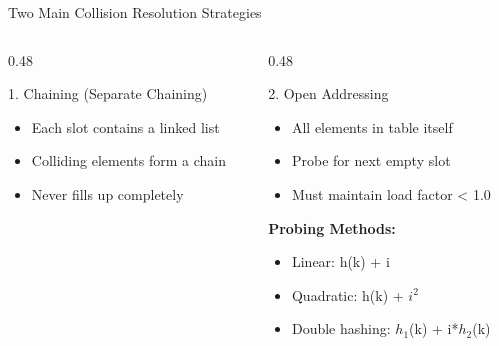 \documentclass[aspectratio=169,xcolor=dvipsnames]{beamer}
\begin{document}
\begin{frame}{Two Main Collision Resolution Strategies}
  \begin{columns}
    \begin{column}{0.48\textwidth}
      \begin{block}{1. Chaining (Separate Chaining)}
        \begin{itemize}
          \item Each slot contains a linked list
          \item Colliding elements form a chain
          \item Never fills up completely
        \end{itemize}

        \vspace{0.3cm}

      \end{block}
    \end{column}
    \begin{column}{0.48\textwidth}
      \begin{block}{2. Open Addressing}
        \begin{itemize}
          \item All elements in table itself
          \item Probe for next empty slot
          \item Must maintain load factor < 1.0
        \end{itemize}

        \vspace{0.3cm}

        \textbf{Probing Methods:}
        \begin{itemize}
          \item Linear: h(k) + i
          \item Quadratic: h(k) + $i^2$
          \item Double hashing: $h_1$(k) + i*$h_2$(k)
        \end{itemize}
      \end{block}
    \end{column}
  \end{columns}
\end{frame}
\end{document}
